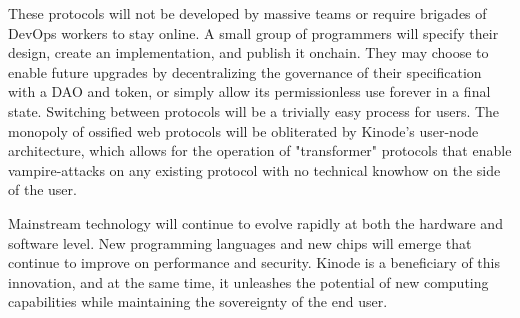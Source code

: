 \documentclass[runningheads]{llncs}
\begin{document}
These protocols will not be developed by massive teams or require brigades of DevOps workers to stay online.
A small group of programmers will specify their design, create an implementation, and publish it onchain.
They may choose to enable future upgrades by decentralizing the governance of their specification with a DAO and token, or simply allow its permissionless use forever in a final state.
Switching between protocols will be a trivially easy process for users.
The monopoly of ossified web protocols will be obliterated by Kinode's user-node architecture, which allows for the operation of "transformer" protocols that enable vampire-attacks on any existing protocol with no technical knowhow on the side of the user.

Mainstream technology will continue to evolve rapidly at both the hardware and software level. New programming languages and new chips will emerge that continue to improve on performance and security.
Kinode is a beneficiary of this innovation, and at the same time, it unleashes the potential of new computing capabilities while maintaining the sovereignty of the end user.
\end{document}

